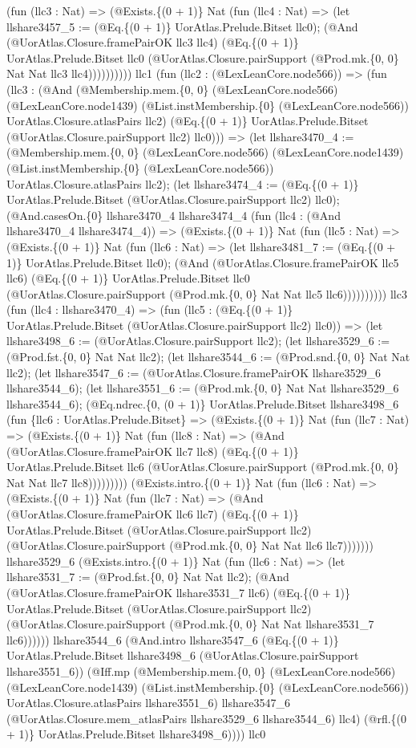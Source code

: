 \documentclass[11pt]{article}
\begin{document}
(fun (llc3 : Nat) => (@Exists.\{(0 + 1)\} Nat (fun (llc4 : Nat) => (let llshare3457\_5 := (@Eq.\{(0 + 1)\} UorAtlas.Prelude.Bitset llc0); (@And (@UorAtlas.Closure.framePairOK llc3 llc4) (@Eq.\{(0 + 1)\} UorAtlas.Prelude.Bitset llc0 (@UorAtlas.Closure.pairSupport (@Prod.mk.\{0, 0\} Nat Nat llc3 llc4)))))))))) llc1 (fun (llc2 : (@LexLeanCore.node566)) => (fun (llc3 : (@And (@Membership.mem.\{0, 0\} (@LexLeanCore.node566) (@LexLeanCore.node1439) (@List.instMembership.\{0\} (@LexLeanCore.node566)) UorAtlas.Closure.atlasPairs llc2) (@Eq.\{(0 + 1)\} UorAtlas.Prelude.Bitset (@UorAtlas.Closure.pairSupport llc2) llc0))) => (let llshare3470\_4 := (@Membership.mem.\{0, 0\} (@LexLeanCore.node566) (@LexLeanCore.node1439) (@List.instMembership.\{0\} (@LexLeanCore.node566)) UorAtlas.Closure.atlasPairs llc2); (let llshare3474\_4 := (@Eq.\{(0 + 1)\} UorAtlas.Prelude.Bitset (@UorAtlas.Closure.pairSupport llc2) llc0); (@And.casesOn.\{0\} llshare3470\_4 llshare3474\_4 (fun (llc4 : (@And llshare3470\_4 llshare3474\_4)) => (@Exists.\{(0 + 1)\} Nat (fun (llc5 : Nat) => (@Exists.\{(0 + 1)\} Nat (fun (llc6 : Nat) => (let llshare3481\_7 := (@Eq.\{(0 + 1)\} UorAtlas.Prelude.Bitset llc0); (@And (@UorAtlas.Closure.framePairOK llc5 llc6) (@Eq.\{(0 + 1)\} UorAtlas.Prelude.Bitset llc0 (@UorAtlas.Closure.pairSupport (@Prod.mk.\{0, 0\} Nat Nat llc5 llc6)))))))))) llc3 (fun (llc4 : llshare3470\_4) => (fun (llc5 : (@Eq.\{(0 + 1)\} UorAtlas.Prelude.Bitset (@UorAtlas.Closure.pairSupport llc2) llc0)) => (let llshare3498\_6 := (@UorAtlas.Closure.pairSupport llc2); (let llshare3529\_6 := (@Prod.fst.\{0, 0\} Nat Nat llc2); (let llshare3544\_6 := (@Prod.snd.\{0, 0\} Nat Nat llc2); (let llshare3547\_6 := (@UorAtlas.Closure.framePairOK llshare3529\_6 llshare3544\_6); (let llshare3551\_6 := (@Prod.mk.\{0, 0\} Nat Nat llshare3529\_6 llshare3544\_6); (@Eq.ndrec.\{0, (0 + 1)\} UorAtlas.Prelude.Bitset llshare3498\_6 (fun \{llc6 : UorAtlas.Prelude.Bitset\} => (@Exists.\{(0 + 1)\} Nat (fun (llc7 : Nat) => (@Exists.\{(0 + 1)\} Nat (fun (llc8 : Nat) => (@And (@UorAtlas.Closure.framePairOK llc7 llc8) (@Eq.\{(0 + 1)\} UorAtlas.Prelude.Bitset llc6 (@UorAtlas.Closure.pairSupport (@Prod.mk.\{0, 0\} Nat Nat llc7 llc8))))))))) (@Exists.intro.\{(0 + 1)\} Nat (fun (llc6 : Nat) => (@Exists.\{(0 + 1)\} Nat (fun (llc7 : Nat) => (@And (@UorAtlas.Closure.framePairOK llc6 llc7) (@Eq.\{(0 + 1)\} UorAtlas.Prelude.Bitset (@UorAtlas.Closure.pairSupport llc2) (@UorAtlas.Closure.pairSupport (@Prod.mk.\{0, 0\} Nat Nat llc6 llc7))))))) llshare3529\_6 (@Exists.intro.\{(0 + 1)\} Nat (fun (llc6 : Nat) => (let llshare3531\_7 := (@Prod.fst.\{0, 0\} Nat Nat llc2); (@And (@UorAtlas.Closure.framePairOK llshare3531\_7 llc6) (@Eq.\{(0 + 1)\} UorAtlas.Prelude.Bitset (@UorAtlas.Closure.pairSupport llc2) (@UorAtlas.Closure.pairSupport (@Prod.mk.\{0, 0\} Nat Nat llshare3531\_7 llc6)))))) llshare3544\_6 (@And.intro llshare3547\_6 (@Eq.\{(0 + 1)\} UorAtlas.Prelude.Bitset llshare3498\_6 (@UorAtlas.Closure.pairSupport llshare3551\_6)) (@Iff.mp (@Membership.mem.\{0, 0\} (@LexLeanCore.node566) (@LexLeanCore.node1439) (@List.instMembership.\{0\} (@LexLeanCore.node566)) UorAtlas.Closure.atlasPairs llshare3551\_6) llshare3547\_6 (@UorAtlas.Closure.mem\_atlasPairs llshare3529\_6 llshare3544\_6) llc4) (@rfl.\{(0 + 1)\} UorAtlas.Prelude.Bitset llshare3498\_6)))) llc0 
\end{document}
